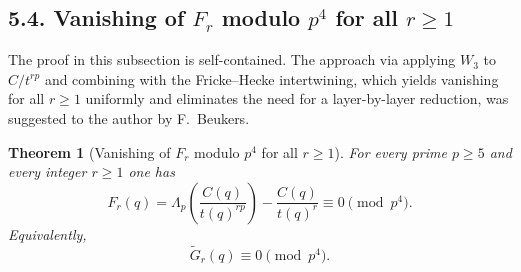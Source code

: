 \documentclass[11pt]{amsart}
\newtheorem{theorem}{Theorem}[section]
\theoremstyle{remark}
\begin{document}
\subsection*{5.4. Vanishing of $F_r$ modulo $p^4$ for all $r\ge1$}

The proof in this subsection is self-contained. The approach via applying $W_3$ to
$C/t^{rp}$ and combining with the Fricke--Hecke intertwining, which yields vanishing
for all $r\ge1$ uniformly and eliminates the need for a layer-by-layer reduction, was
suggested to the author by F.~Beukers.

\begin{theorem}[Vanishing of $F_r$ modulo $p^4$ for all $r\ge1$]\label{thm:fricke-vanishing}
For every prime $p\ge5$ and every integer $r\ge1$ one has
\[
F_r(q)=\Lambda_p\!\left(\frac{C(q)}{t(q)^{rp}}\right)-\frac{C(q)}{t(q)^r}\equiv0\pmod{p^4}.
\]
Equivalently,
\[
\widetilde G_r(q)\equiv0\pmod{p^4}.
\]
\end{theorem}
\end{document}
